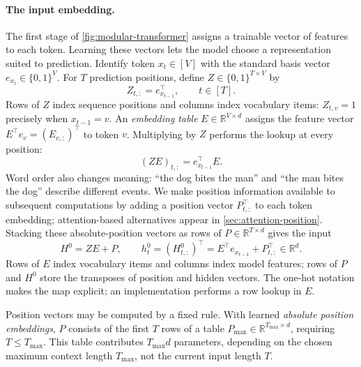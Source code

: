 \documentclass[11pt,twoside]{article}
\newcommand{\R}{\mathbb R}
\theoremstyle{plain}
\theoremstyle{definition}
\theoremstyle{remark}
\begin{document}
\paragraph{The input embedding.}
The first stage of \cref{fig:modular-transformer} assigns a trainable vector
of features to each token. Learning these vectors lets the model choose a
representation suited to prediction.
Identify token $x_t\in[V]$ with the standard basis vector
$e_{x_t}\in\{0,1\}^V$. For $T$ prediction positions, define
$Z\in\{0,1\}^{T\times V}$ by
\begin{equation}
Z_{t,:}=e_{x_{t-1}}^\top,
\qquad t\in[T].
\end{equation}
Rows of $Z$ index sequence positions and columns index vocabulary items:
$Z_{t,v}=1$ precisely when $x_{t-1}=v$.
An \emph{embedding table} $E\in\R^{V\times d}$ assigns the feature vector
$E^\top e_v=(E_{v,:})^\top$ to token $v$. Multiplying by $Z$ performs the
lookup at every position:
\[
(ZE)_{t,:}=e_{x_{t-1}}^\top E.
\]
Word order also changes meaning: ``the dog bites the man'' and ``the man
bites the dog'' describe different events. We make position information
available to subsequent computations by adding a position vector
$P_{t,:}^\top$ to each token embedding; attention-based alternatives appear in
\cref{sec:attention-position}. Stacking these absolute-position vectors as
rows of $P\in\R^{T\times d}$ gives the input
\begin{equation}
H^0=ZE+P,
\qquad
h_t^0=(H^0_{t,:})^\top
=E^\top e_{x_{t-1}}+P_{t,:}^\top\in\R^d.
\label{eq:input-embedding}
\end{equation}
Rows of $E$ index vocabulary items and columns index model features;
rows of $P$ and $H^0$ store the transposes of position and hidden vectors.\label{rem:position-placement}
The one-hot notation makes the map explicit; an implementation performs a
row lookup in $E$.

Position vectors may be computed by a fixed rule. With learned \emph{absolute
position embeddings}, $P$ consists of the first $T$ rows of a table
$P_{\max}\in\R^{T_{\max}\times d}$, requiring $T\leq T_{\max}$.
This table contributes $T_{\max}d$ parameters, depending on the chosen
maximum context length $T_{\max}$, not the current input length $T$.
\end{document}
